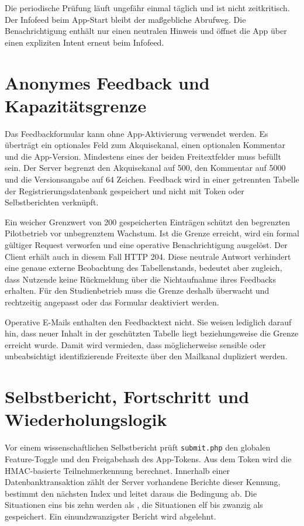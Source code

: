Die periodische Prüfung läuft ungefähr einmal täglich und ist nicht zeitkritisch. Der Infofeed beim App-Start bleibt der maßgebliche Abrufweg. Die Benachrichtigung enthält nur einen neutralen Hinweis und öffnet die App über einen expliziten Intent erneut beim Infofeed.

\section{Anonymes Feedback und Kapazitätsgrenze}
Das Feedbackformular kann ohne App-Aktivierung verwendet werden. Es überträgt ein optionales Feld zum Akquisekanal, einen optionalen Kommentar und die App-Version. Mindestens eines der beiden Freitextfelder muss befüllt sein. Der Server begrenzt den Akquisekanal auf 500, den Kommentar auf 5000 und die Versionsangabe auf 64 Zeichen. Feedback wird in einer getrennten Tabelle der Registrierungsdatenbank gespeichert und nicht mit Token oder Selbstberichten verknüpft.

Ein weicher Grenzwert von 200 gespeicherten Einträgen schützt den begrenzten Pilotbetrieb vor unbegrenztem Wachstum. Ist die Grenze erreicht, wird ein formal gültiger Request verworfen und eine operative Benachrichtigung ausgelöst. Der Client erhält auch in diesem Fall HTTP 204. Diese neutrale Antwort verhindert eine genaue externe Beobachtung des Tabellenstands, bedeutet aber zugleich, dass Nutzende keine Rückmeldung über die Nichtaufnahme ihres Feedbacks erhalten. Für den Studienbetrieb muss die Grenze deshalb überwacht und rechtzeitig angepasst oder das Formular deaktiviert werden.

Operative E-Mails enthalten den Feedbacktext nicht. Sie weisen lediglich darauf hin, dass neuer Inhalt in der geschützten Tabelle liegt beziehungsweise die Grenze erreicht wurde. Damit wird vermieden, dass möglicherweise sensible oder unbeabsichtigt identifizierende Freitexte über den Mailkanal dupliziert werden.

\section{Selbstbericht, Fortschritt und Wiederholungslogik}

Vor einem wissenschaftlichen Selbstbericht prüft \texttt{submit.php} den globalen Feature-Toggle und den Freigabehash des App-Tokens. Aus dem Token wird die HMAC-basierte Teilnehmerkennung berechnet. Innerhalb einer Datenbanktransaktion zählt der Server vorhandene Berichte dieser Kennung, bestimmt den nächsten Index und leitet daraus die Bedingung ab. Die Situationen eins bis zehn werden als , die Situationen elf bis zwanzig als  gespeichert. Ein einundzwanzigster Bericht wird abgelehnt.

